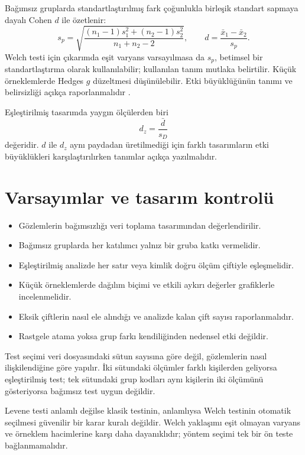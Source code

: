 Bağımsız gruplarda standartlaştırılmış fark çoğunlukla birleşik standart
sapmaya dayalı Cohen $d$ ile özetlenir:
\[
s_p=\sqrt{\frac{(n_1-1)s_1^2+(n_2-1)s_2^2}{n_1+n_2-2}},
\qquad
d=\frac{\bar x_1-\bar x_2}{s_p}.
\]
Welch testi için çıkarımda eşit varyans varsayılmasa da $s_p$, betimsel bir
standartlaştırma olarak kullanılabilir; kullanılan tanım mutlaka belirtilir.
Küçük örneklemlerde Hedges $g$ düzeltmesi düşünülebilir.
Etki büyüklüğünün tanımı ve belirsizliği açıkça raporlanmalıdır
\citep{lakens2013}.

Eşleştirilmiş tasarımda yaygın ölçülerden biri
\[
d_z=\frac{\bar d}{s_D}
\]
değeridir. $d$ ile $d_z$ aynı paydadan üretilmediği için farklı tasarımların
etki büyüklükleri karşılaştırılırken tanımlar açıkça yazılmalıdır.

\section{Varsayımlar ve tasarım kontrolü}

\begin{itemize}
  \item Gözlemlerin bağımsızlığı veri toplama tasarımından değerlendirilir.
  \item Bağımsız gruplarda her katılımcı yalnız bir gruba katkı vermelidir.
  \item Eşleştirilmiş analizde her satır veya kimlik doğru ölçüm çiftiyle eşleşmelidir.
  \item Küçük örneklemlerde dağılım biçimi ve etkili aykırı değerler grafiklerle incelenmelidir.
  \item Eksik çiftlerin nasıl ele alındığı ve analizde kalan çift sayısı raporlanmalıdır.
  \item Rastgele atama yoksa grup farkı kendiliğinden nedensel etki değildir.
\end{itemize}

\begin{assumptionbox}
Test seçimi veri dosyasındaki sütun sayısına göre değil, gözlemlerin nasıl
ilişkilendiğine göre yapılır. İki sütundaki ölçümler farklı kişilerden
geliyorsa eşleştirilmiş test; tek sütundaki grup kodları aynı kişilerin iki
ölçümünü gösteriyorsa bağımsız test uygun değildir.
\end{assumptionbox}

\begin{mistakebox}
Levene testi anlamlı değilse klasik \tstat testinin, anlamlıysa Welch testinin
otomatik seçilmesi güvenilir bir karar kuralı değildir. Welch yaklaşımı eşit
olmayan varyans ve örneklem hacimlerine karşı daha dayanıklıdır; yöntem seçimi
tek bir ön teste bağlanmamalıdır.
\end{mistakebox}

